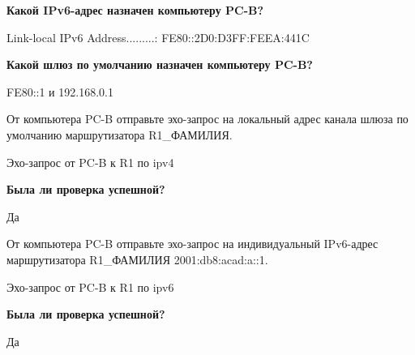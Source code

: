 \textbf{Какой IPv6-адрес назначен компьютеру PC-B?}

Link-local IPv6 Address.........: FE80::2D0:D3FF:FEEA:441C

\textbf{Какой шлюз по умолчанию назначен компьютеру PC-B?}

FE80::1 и 192.168.0.1

От компьютера PC-B отправьте эхо-запрос на локальный адрес
канала шлюза по умолчанию маршрутизатора R1\_ФАМИЛИЯ.

\begin{image}
	\caption{Эхо-запрос от PC-B к R1 по ipv4}
\end{image}

\textbf{Была ли проверка успешной?}

Да

От компьютера PC-B отправьте эхо-запрос на индивидуальный IPv6-адрес
маршрутизатора R1\_ФАМИЛИЯ 2001:db8:acad:a::1.

\begin{image}
	\caption{Эхо-запрос от PC-B к R1 по ipv6}
\end{image}


\textbf{Была ли проверка успешной?}

Да

